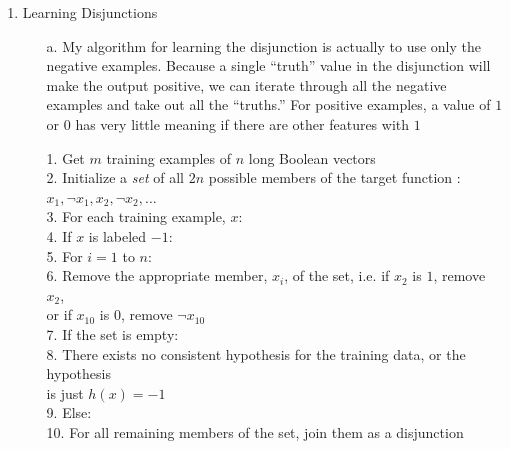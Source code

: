 
\usepackage{graphicx}

\oddsidemargin 0in
\evensidemargin 0in
\textwidth 6.5in
\topmargin -0.5in
\textheight 9.0in
\newcommand{\norm}[1]{\left\lVert #1 \right\rVert}



\pagestyle{myheadings}

\begin{enumerate}
\item Learning Disjunctions
      	\begin{enumerate}\parindent-4pt
		\item[a.]
			My algorithm for learning the disjunction is actually to use only the negative examples. Because a single ``truth'' value in the disjunction will make the output positive, we can iterate through all the negative examples and take out all the ``truths.'' For positive examples, a value of $1$ or $0$ has very little meaning if there are other features with $1$ 
			\begin{algorithm}
				1. Get $m$ training examples of $n$ long Boolean vectors\\
				2. Initialize a \textit{set} of all $2n$ possible members of the target function : $x_1, \neg x_1, x_2, \neg x_2, \ldots$ \\
				3. For each training example, $x$:\\
				4. \>\> If $x$ is labeled $-1$:\\
				5. \>\>\>	For $i=1$ to $n$:\\
				6. \>\>\>\>		Remove the appropriate member, $x_i$, of the set, i.e. if $x_2$ is $1$, remove $x_2$,\\ 
				   \>\>\>\>		or if $x_{10}$ is $0$, remove $\neg x_{10}$\\
				7. If the set is empty:\\
				8. \>\>	There exists no consistent hypothesis for the training data, or the hypothesis\\
                                   \>\> is just $h(x)=-1$\\
				9. Else:\\
				10.\>\> For all remaining members of the set, join them as a disjunction\\
			\end{algorithm}
				

\end{enumerate}
\end{enumerate}

